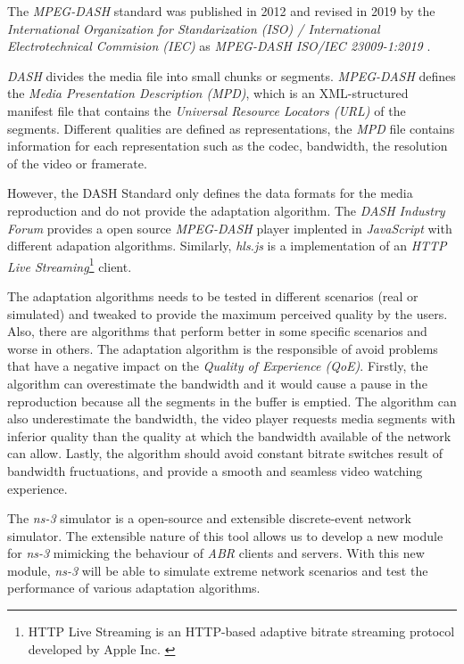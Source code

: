 The \textit{MPEG-DASH} standard was published in 2012 and revised in 2019 
by the \textit{International Organization for Standarization (ISO) / International 
Electrotechnical Commision (IEC)} as \textit{MPEG-DASH ISO/IEC 23009-1:2019}
\cite{ISO23009}.

\textit{DASH} divides the media file into small chunks or segments.
\textit{MPEG-DASH} defines the \textit{Media Presentation Description (MPD)}, 
which is an XML-structured manifest file that contains the \textit{Universal Resource 
Locators (URL)} of the segments. Different qualities are defined as representations,
the \textit{MPD} file contains information for each representation such as the
codec, bandwidth, the resolution of the video or framerate.

However, the DASH Standard\cite{ISO23009} only defines the data formats
for the media reproduction and do not provide the adaptation algorithm.
The \textit{DASH Industry Forum}\cite{dash2} provides a open source \textit{MPEG-DASH} 
player implented in \textit{JavaScript} with different adapation algorithms.
Similarly, \textit{hls.js} is a implementation of an \textit{HTTP Live Streaming}\footnote{HTTP
Live Streaming is an HTTP-based adaptive bitrate streaming protocol developed by Apple Inc.
\cite{hls1}} client.

The adaptation algorithms needs to be tested in different scenarios (real or simulated)
and tweaked to provide the maximum perceived quality by the users. Also, there are
algorithms that perform better in some specific scenarios and worse in others. The adaptation
algorithm is the responsible of avoid problems that have a negative impact
on the \textit{Quality of Experience (QoE)}. Firstly, the algorithm can overestimate
the bandwidth and it would cause a pause in the reproduction because all the 
segments in the buffer is emptied. The algorithm can also underestimate the bandwidth,
the video player requests media segments with inferior quality than the quality at which the 
bandwidth available of the network can allow. Lastly, the algorithm should avoid
constant bitrate switches result of bandwidth fructuations, and provide a smooth and
seamless video watching experience.

The \textit{ns-3} simulator is a open-source and extensible discrete-event network simulator. 
The extensible nature of this tool allows us to develop a new module for \textit{ns-3}
mimicking the behaviour of \textit{ABR} clients and servers. With this new module, \textit{ns-3} 
will be able to simulate extreme network scenarios and test the performance of 
various adaptation algorithms.

